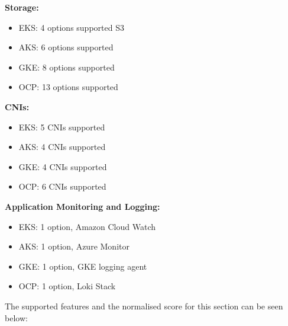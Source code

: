 \textbf{Storage:}

\begin{itemize}
\tightlist
\item
  EKS: 4 options supported
  S3 \cite{StoreApplicationData}
\item
     AKS: 6 options supported \cite{tamramConceptsStorageAzure2024}
\item
  GKE: 8 options supported \cite{StorageGKEClusters} 
\item
  OCP: 13 options supported \cite{UnderstandingPersistentStorage} 
\end{itemize}

\textbf{CNIs:}

\begin{itemize}
\tightlist
\item
  EKS: 5 CNIs supported \cite{AlternateCNIPlugins}
\item
  AKS: 4 CNIs supported \cite{schaffererinConceptsCNINetworking2024}
\item
  GKE: 4 CNIs supported \cite{NetworkOverviewGooglea}
\item
  OCP: 6 CNIs supported \cite{CertifiedOpenShiftCNI2024}
\end{itemize}

\textbf{Application Monitoring and Logging:}

\begin{itemize}
\tightlist
\item
  EKS: 1 option, Amazon Cloud Watch \cite{MonitorYourCluster}
\item
  AKS: 1 option, Azure Monitor \cite{martinekuanMonitorMicroservicesApplication}
\item
  GKE: 1 option, GKE logging agent \cite{GKELogsGoogle} 
\item
  OCP: 1 option, Loki Stack \cite{Logging60Logging}
\end{itemize}

The supported features and the normalised score for this section can be seen below:

